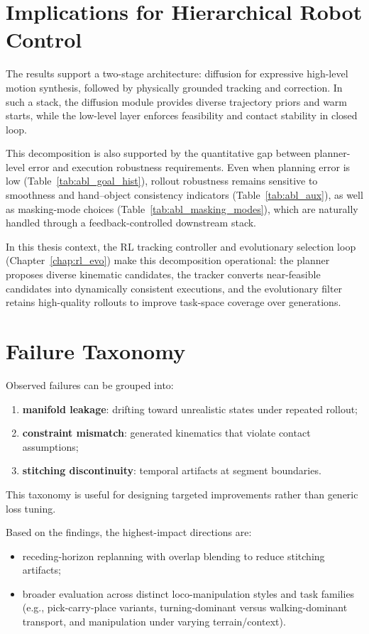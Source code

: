 \section{Implications for Hierarchical Robot Control}

The results support a two-stage architecture: diffusion for expressive high-level motion synthesis, followed by physically grounded tracking and correction. In such a stack, the diffusion module provides diverse trajectory priors and warm starts, while the low-level layer enforces feasibility and contact stability in closed loop.

This decomposition is also supported by the quantitative gap between planner-level error and execution robustness requirements. Even when planning error is low (Table~\ref{tab:abl_goal_hist}), rollout robustness remains sensitive to smoothness and hand--object consistency indicators (Table~\ref{tab:abl_aux}), as well as masking-mode choices (Table~\ref{tab:abl_masking_modes}), which are naturally handled through a feedback-controlled downstream stack.

In this thesis context, the RL tracking controller and evolutionary selection loop (Chapter~\ref{chap:rl_evo}) make this decomposition operational: the planner proposes diverse kinematic candidates, the tracker converts near-feasible candidates into dynamically consistent executions, and the evolutionary filter retains high-quality rollouts to improve task-space coverage over generations.

\section{Failure Taxonomy}

Observed failures can be grouped into:
\begin{enumerate}
	\item \textbf{manifold leakage}: drifting toward unrealistic states under repeated rollout;
	\item \textbf{constraint mismatch}: generated kinematics that violate contact assumptions;
	\item \textbf{stitching discontinuity}: temporal artifacts at segment boundaries.
\end{enumerate}

This taxonomy is useful for designing targeted improvements rather than generic loss tuning.

Based on the findings, the highest-impact directions are:
\begin{itemize}
	\item receding-horizon replanning with overlap blending to reduce stitching artifacts;
	\item broader evaluation across distinct loco-manipulation styles and task families (e.g., pick-carry-place variants, turning-dominant versus walking-dominant transport, and manipulation under varying terrain/context).
\end{itemize}

